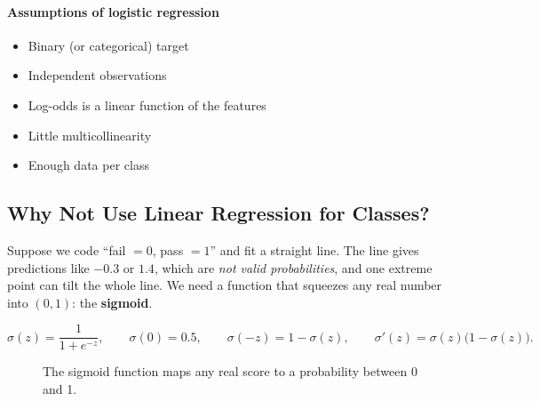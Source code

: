 \paragraph{Assumptions of logistic regression}
\begin{itemize}
  \item Binary (or categorical) target
  \item Independent observations
  \item Log-odds is a linear function of the features
  \item Little multicollinearity
  \item Enough data per class
\end{itemize}

\subsection{Why Not Use Linear Regression for Classes?}

Suppose we code ``fail $=0$, pass $=1$'' and fit a straight line. The line gives predictions like $-0.3$ or $1.4$, which are \emph{not valid probabilities}, and one extreme point can tilt the whole line. We need a function that squeezes any real number into $(0,1)$: the \textbf{sigmoid}.

\begin{definition}
\[
  \sigma(z)=\frac{1}{1+e^{-z}},\qquad \sigma(0)=0.5,\qquad \sigma(-z)=1-\sigma(z),\qquad \sigma'(z)=\sigma(z)\big(1-\sigma(z)\big).
\]
\end{definition}

\begin{figure}[!htbp]
\centering
{}
\caption{The sigmoid function maps any real score to a probability between 0 and 1.}\label{fig:sigmoid}
\end{figure}

